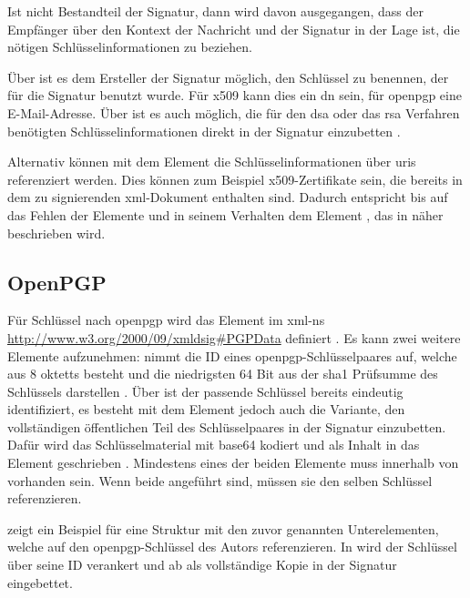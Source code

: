 Ist  nicht Bestandteil der Signatur, dann wird davon ausgegangen, dass der Empfänger über den Kontext der Nachricht und der Signatur in der
Lage ist, die nötigen Schlüsselinformationen zu beziehen.

Über  ist es dem Ersteller der Signatur möglich, den Schlüssel zu benennen, der für die Signatur benutzt wurde. Für \gls{x509} kann dies ein
\gls{dn} sein, für \gls{openpgp} eine E-Mail-Adresse. Über  ist es auch möglich, die für den \gls{dsa} oder das \gls{rsa} Verfahren
benötigten Schlüsselinformationen direkt in der Signatur einzubetten \cite{xml-dsig:w3c}.  

Alternativ können mit dem Element  die Schlüsselinformationen über \glspl{uri} referenziert werden. Dies können zum Beispiel
\gls{x509}-Zertifikate sein, die bereits in dem zu signierenden \gls{xml}-Dokument enthalten sind. Dadurch entspricht  bis auf
das Fehlen der Elemente  und  in seinem Verhalten dem Element , das in
 näher beschrieben wird.

\subsection{OpenPGP}
Für Schlüssel nach \gls{openpgp} wird das Element  im \gls{xml-ns} \url{http://www.w3.org/2000/09/xmldsig#PGPData}
definiert \cite{xml-sec-uri:ietf}. Es kann zwei weitere Elemente aufzunehmen:  nimmt die ID eines \gls{openpgp}-Schlüsselpaares
auf, welche aus 8 \glspl{oktett} besteht und die niedrigsten 64 Bit aus der \gls{sha1} Prüfsumme des Schlüssels darstellen \cite{openpgp:ietf}. Über 
 ist der passende Schlüssel bereits eindeutig identifiziert, es besteht mit dem Element  jedoch auch die Variante, den
vollständigen öffentlichen Teil des Schlüsselpaares in der Signatur einzubetten. Dafür wird das Schlüsselmaterial mit \gls{base64} kodiert und als Inhalt in das
Element geschrieben \cite{xml-dsig:w3c}. Mindestens eines der beiden Elemente muss innerhalb von  vorhanden sein. Wenn beide angeführt sind,
müssen sie den selben Schlüssel referenzieren.

 zeigt ein Beispiel für eine Struktur mit den zuvor genannten Unterelementen, welche auf den \gls{openpgp}-Schlüssel des Autors
referenzieren. In  wird der Schlüssel über seine ID verankert und ab  als
vollständige Kopie in der Signatur eingebettet.

